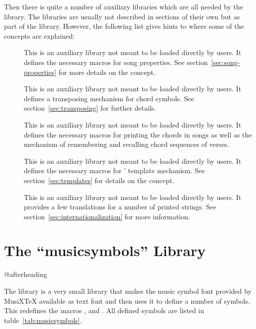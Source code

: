 \documentclass[load-preamble+]{cnltx-doc}
\def\library*#1{``#1''}%
\begin{document}
Then there is quite a number of auxiliary libraries which are all needed by
the  library.  The libraries are usually not described in
sections of their own but as part of the  library.  However,
the following list gives hints to where some of the concepts are explained:
\begin{description}
  \item[] This is an auxiliary library not meant to be
    loaded directly by users.  It defines the necessary macros for song
    properties.  See section~\ref{sec:song-properties} for more details on the
    concept.
  \item[]  This is an auxiliary library not meant to be
    loaded directly by users.  It defines a transposing mechanism for chord
    symbols.  See section~\ref{sec:transposing} for further details.
  \item[]  This is an auxiliary library not meant to be loaded
    directly by users.  It defines the necessary macros for printing the
    chords in songs as well as the mechanism of remembering and recalling
    chord sequences of verses.
  \item[] This is an auxiliary library not meant to be
    loaded directly by users.  It defines the necessary macros for
    \leadsheets' template mechanism.  See section~\ref{sec:templates} for
    details on the concept.
  \item[] This is an auxiliary library not meant to be
    loaded directly by users.  It provides a few translations for a number of
    printed strings.  See section~\ref{sec:internationalization} for more
    information.
\end{description}

\part{The \library*{musicsymbols} Library}\label{part:musicsymbols-library}
\vspace*{\baselineskip}\csname @afterheading\endcsname

The \musicsymbols{} library is a very small library that makes the music
symbol font provided by MusiX\TeX{} available as text font and then uses it to
define a number of symbols.  This redefines the macros , 
and .  All defined symbols are listed in
table~\ref{tab:musicsymbols}.
\end{document}
